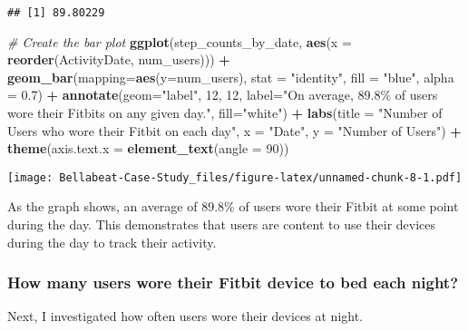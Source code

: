 \documentclass[
]{article}
\newenvironment{Shaded}{\begin{snugshade}}{\end{snugshade}}
\newcommand{\AttributeTok}[1]{\textcolor[rgb]{0.13,0.29,0.53}{#1}}
\newcommand{\CommentTok}[1]{\textcolor[rgb]{0.56,0.35,0.01}{\textit{#1}}}
\newcommand{\DecValTok}[1]{\textcolor[rgb]{0.00,0.00,0.81}{#1}}
\newcommand{\FloatTok}[1]{\textcolor[rgb]{0.00,0.00,0.81}{#1}}
\newcommand{\FunctionTok}[1]{\textcolor[rgb]{0.13,0.29,0.53}{\textbf{#1}}}
\newcommand{\NormalTok}[1]{#1}
\newcommand{\SpecialCharTok}[1]{\textcolor[rgb]{0.81,0.36,0.00}{\textbf{#1}}}
\newcommand{\StringTok}[1]{\textcolor[rgb]{0.31,0.60,0.02}{#1}}
\begin{document}
\begin{verbatim}
## [1] 89.80229
\end{verbatim}

\begin{Shaded}
\begin{Highlighting}[]
\CommentTok{\# Create the bar plot}
\FunctionTok{ggplot}\NormalTok{(step\_counts\_by\_date, }\FunctionTok{aes}\NormalTok{(}\AttributeTok{x =} \FunctionTok{reorder}\NormalTok{(ActivityDate, num\_users))) }\SpecialCharTok{+}
  \FunctionTok{geom\_bar}\NormalTok{(}\AttributeTok{mapping=}\FunctionTok{aes}\NormalTok{(}\AttributeTok{y=}\NormalTok{num\_users), }\AttributeTok{stat =} \StringTok{"identity"}\NormalTok{, }\AttributeTok{fill =} \StringTok{"blue"}\NormalTok{, }\AttributeTok{alpha =} \FloatTok{0.7}\NormalTok{) }\SpecialCharTok{+} 
  \FunctionTok{annotate}\NormalTok{(}\AttributeTok{geom=}\StringTok{"label"}\NormalTok{, }\DecValTok{12}\NormalTok{, }\DecValTok{12}\NormalTok{, }\AttributeTok{label=}\StringTok{"On average, 89.8\% of users }
\StringTok{           wore their Fitbits on any given day."}\NormalTok{, }\AttributeTok{fill=}\StringTok{"white"}\NormalTok{) }\SpecialCharTok{+}
  \FunctionTok{labs}\NormalTok{(}\AttributeTok{title =} \StringTok{"Number of Users who wore their Fitbit on each day"}\NormalTok{,}
       \AttributeTok{x =} \StringTok{"Date"}\NormalTok{,}
       \AttributeTok{y =} \StringTok{"Number of Users"}\NormalTok{) }\SpecialCharTok{+}
  \FunctionTok{theme}\NormalTok{(}\AttributeTok{axis.text.x =} \FunctionTok{element\_text}\NormalTok{(}\AttributeTok{angle =} \DecValTok{90}\NormalTok{))}
\end{Highlighting}
\end{Shaded}

\texttt{[image: Bellabeat-Case-Study\_files/figure-latex/unnamed-chunk-8-1.pdf]}

As the graph shows, an average of 89.8\% of users wore their Fitbit at
some point during the day. {This demonstrates that users are content to
use their devices during the day to track their activity.}

\hypertarget{how-many-users-wore-their-fitbit-device-to-bed-each-night}{%
\subsubsection{How many users wore their Fitbit device to bed each
night?}\label{how-many-users-wore-their-fitbit-device-to-bed-each-night}}

Next, I investigated how often users wore their devices at night.
\end{document}
